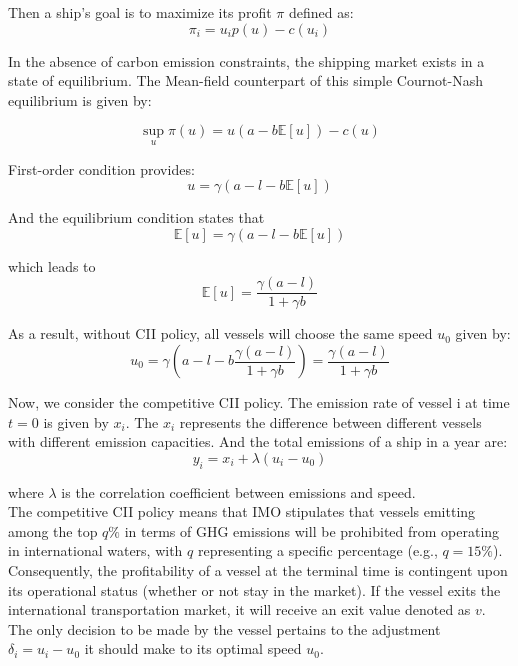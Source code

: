 \documentclass[a4paper,12pt]{article}
\begin{document}
Then a ship's goal is to maximize its profit $\pi$ defined as:
\begin{equation}
	\label{eq:profit}
	\pi_i=u_ip(u)-c(u_i)
\end{equation}

In the absence of carbon emission constraints, the shipping market exists in a state of equilibrium. The Mean-field counterpart of this simple Cournot-Nash equilibrium is given by:

\begin{equation}
	\label{eq:Cournot-Nash}
	\operatorname*{sup}_{u} \pi(u) = u(a-b\mathbb{E}[u])-c(u)
\end{equation}

First-order condition provides:
\begin{equation}
	\label{eq:equilibrium1}
	u = \gamma(a-l-b\mathbb{E}[u])
\end{equation}

And the equilibrium condition states that
\begin{equation}
	\label{eq:condition1}
	\mathbb{E}[u]= \gamma (a-l-b\mathbb{E}[u])
\end{equation}

which leads to
\begin{equation}
	\mathbb{E}[u] = \dfrac{\gamma (a-l)}{1+\gamma b}
\end{equation}

As a result, without CII policy, all vessels will choose the same speed $u_0$ given by:
\begin{equation}
	\label{eq:u0}
	u_0 = \gamma \left(a-l-b \dfrac{\gamma (a-l)}{1+\gamma b} \right)=\dfrac{\gamma (a-l)}{1+\gamma b}
\end{equation}

Now, we consider the competitive CII policy. The emission rate of vessel i at time $t=0$ is given by $x_i$.
The $x_i$ represents the difference between different vessels with different emission capacities. And the total emissions of a ship in a year are:
\begin{equation}
	\label{eq:y}
	y_i = x_i + \lambda(u_i-u_0)
\end{equation}

where $\lambda$ is the correlation coefficient between emissions and speed.\\

The competitive CII policy means that IMO stipulates that vessels emitting among the top $q\%$ in terms of GHG emissions will be prohibited from operating in international waters, with $q$ representing a specific percentage (e.g., $q = 15\%$).
Consequently, the profitability of a vessel at the terminal time is contingent upon its operational status (whether or not stay in the market).
If the vessel exits the international transportation market, it will receive an exit value denoted as $v$.
The only decision to be made by the vessel pertains to the adjustment $\delta_i=u_i-u_0$ it should make to its optimal speed $u_0$.\\
\end{document}
